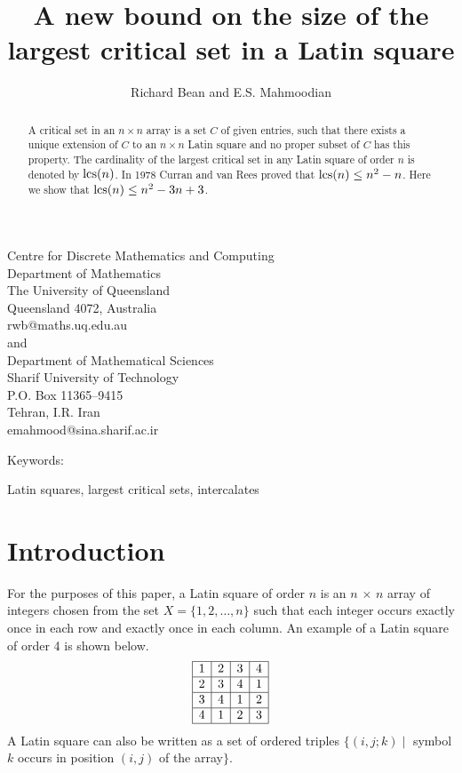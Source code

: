 \documentclass[12pt]{article}
\title{{\bf A new bound on the size of the largest critical set in a Latin square}}
\author{\sc Richard Bean and E.S. Mahmoodian}
\date{}
\def\lcs#1{{\rm lcs}(#1)}
\begin{document}
\maketitle
%
\begin{center}
Centre for Discrete Mathematics and Computing \\
Department of Mathematics \\
The University of Queensland \\
Queensland 4072, Australia \\
rwb@maths.uq.edu.au \\
%
and\\
 Department of Mathematical Sciences \\
 Sharif University of Technology \\
 P.O. Box 11365--9415 \\
 Tehran, I.R. Iran \\
emahmood@sina.sharif.ac.ir \\
\end{center}
%
\begin{abstract}
A {\sf critical set }
in an $n \times n$ array is a set $C$ of given entries, such that
there exists a unique extension of  $C$ to  an
$n\times n$ Latin square and no proper subset of $C$ has this property.
The cardinality of the largest critical set in any Latin square
of order $n$ is denoted by $\lcs{n}$.  In 1978 Curran and van Rees proved that
$\lcs{n} \leq n^2 - n$.  Here we show that $\lcs{n} \leq n^2-3n+3$.
\end{abstract}
\begin{bf}Keywords:\end{bf} Latin squares, largest critical sets, intercalates
\section{Introduction}        %
For the purposes of this paper, a {\sf Latin square} of order $n$ is an
$n$ $\times$ $n$ array of integers chosen from the set
$X = \{1,2, \ldots, n\}$ such that
each integer occurs exactly once in each row and exactly once in each column.
An example of a Latin square of order 4 is shown below.
%
$$
\begin{array}{|c|c|c|c|}
\hline 1&2&3&4 \\
\hline 2&3&4&1 \\
\hline 3&4&1&2 \\
\hline 4&1&2&3 \\
\hline \end{array}
$$
%
A Latin square can also be written as a set of ordered triples
$\{ (i,j;k) \mid$  symbol $k$ occurs in position $(i,j)$ of the array$\}$.
\end{document}
